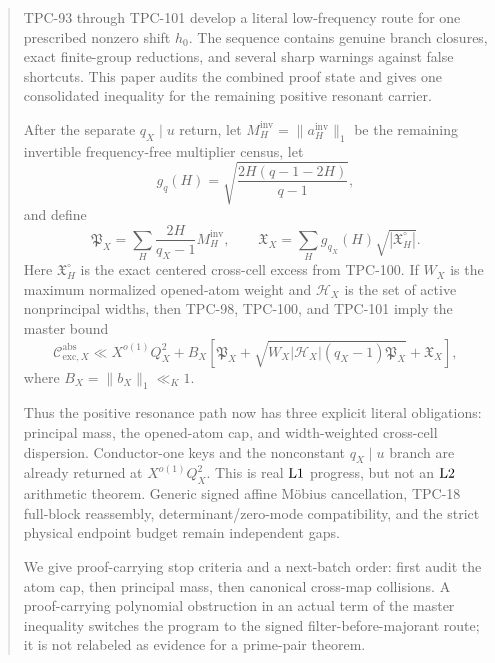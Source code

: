 \begin{abstract}
TPC-93 through TPC-101 develop a literal low-frequency route for one
prescribed nonzero shift \(h_0\).  The sequence contains genuine
branch closures, exact finite-group reductions, and several sharp
warnings against false shortcuts.  This paper audits the combined
proof state and gives one consolidated inequality for the remaining
positive resonant carrier.

After the separate \(q_X\mid u\) return, let
\(M_H^{\mathrm{inv}}=\|a_H^{\mathrm{inv}}\|_1\) be the remaining
invertible frequency-free multiplier census, let
\[
 g_q(H)
 =
 \sqrt{\frac{2H(q-1-2H)}{q-1}},
\]
and define
\[
 \mathfrak P_X
 =
 \sum_H\frac{2H}{q_X-1}M_H^{\mathrm{inv}},\qquad
 \mathfrak X_X
 =
 \sum_Hg_{q_X}(H)
 \sqrt{|\mathfrak X_H^\circ|}.
\]
Here \(\mathfrak X_H^\circ\) is the exact centered cross-cell excess
from TPC-100.  If \(W_X\) is the maximum normalized opened-atom
weight and \(\mathcal H_X\) is the set of active nonprincipal
widths, then TPC-98, TPC-100, and TPC-101 imply the master bound
\[
 \boxed{
 \mathcal C_{\mathrm{exc},X}^{\mathrm{abs}}
 \ll
 X^{o(1)}Q_X^2
 +
 B_X\!\left[
 \mathfrak P_X
 +
 \sqrt{
 W_X|\mathcal H_X|(q_X-1)\mathfrak P_X}
 +
 \mathfrak X_X
 \right],}
\]
where \(B_X=\|b_X\|_1\ll_K1\).

Thus the positive resonance path now has three explicit literal
obligations: principal mass, the opened-atom cap, and
width-weighted cross-cell dispersion.  Conductor-one keys and the
nonconstant \(q_X\mid u\) branch are already returned at
\(X^{o(1)}Q_X^2\).  This is real \(\Lone\) progress, but not an
\(\Ltwo\) arithmetic theorem.  Generic signed affine M\"obius
cancellation, TPC-18 full-block reassembly, determinant/zero-mode
compatibility, and the strict physical endpoint budget remain
independent gaps.

We give proof-carrying stop criteria and a next-batch order:
first audit the atom cap, then principal mass, then canonical
cross-map collisions.  A proof-carrying polynomial obstruction in
an actual term of the master inequality switches the program to the
signed filter-before-majorant route; it is not relabeled as evidence
for a prime-pair theorem.
\end{abstract}
